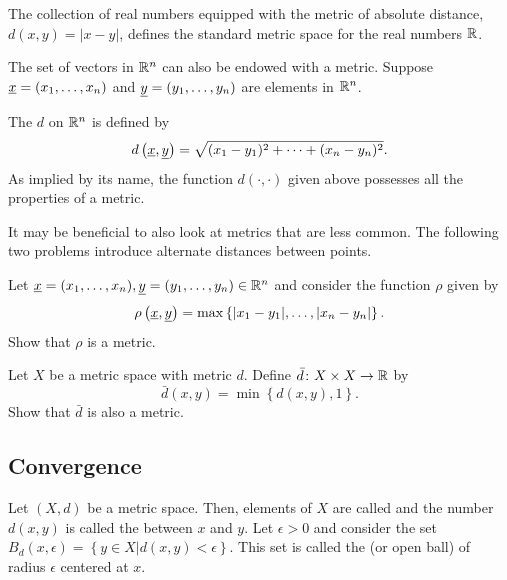 \begin{example}
The collection of real numbers equipped with the metric of absolute distance, $d(x,y) = |x-y|$, defines the standard metric space for the real numbers $\mathbb{R}$.
\end{example}

\begin{example}
The set of vectors in $\mathbb{R}^n$ can also be endowed with a metric.
Suppose $\underline{x} = (x_1, \ldots, x_n)$ and $\underline{y} = (y_1, \ldots, y_n)$ are elements in $\mathbb{R}^n$.

The  $d$ on $\mathbb{R}^n$ is defined by
\begin{equation*}
d \left( \underline{x}, \underline{y} \right)
= \sqrt{ (x_1 - y_1)^2 + \cdots + (x_n - y_n)^2 }.
\end{equation*}
As implied by its name, the function $d(\cdot, \cdot)$ given above possesses all the properties of a metric.
\end{example}

It may be beneficial to also look at metrics that are less common.
The following two problems introduce alternate distances between points.

\begin{problem}
Let $\underline{x} = (x_1, \ldots, x_n), \underline{y} = (y_1, \ldots, y_n) \in \mathbb{R}^n$ and consider the function $\rho$ given by
\begin{equation*}
\rho \left( \underline{x}, \underline{y} \right)
= \max \left\{ |x_1 - y_1|, \ldots, |x_n - y_n| \right\}.
\end{equation*}
Show that $\rho$ is a metric.
\end{problem}

\begin{problem} \label{problem:StandardBoundedMetric}
Let $X$ be a metric space with metric $d$.
Define $\bar{d}  \colon X \times X \rightarrow \mathbb{R}$ by
\begin{equation*}
\bar{d} (x, y)
= \min \left\{ d (x, y), 1 \right\}.
\end{equation*}
Show that $\bar{d}$ is also a metric.
\end{problem}


\subsection{Convergence}

Let $(X,d)$ be a metric space.
Then, elements of $X$ are called  and the number $d(x,y)$ is called the  between $x$ and $y$.
Let $\epsilon > 0$ and consider the set $B_d(x,\epsilon) = \left\{ y \in X | d(x,y) < \epsilon \right\}$.
This set is called the  (or open ball) of radius $\epsilon$ centered at $x$.

